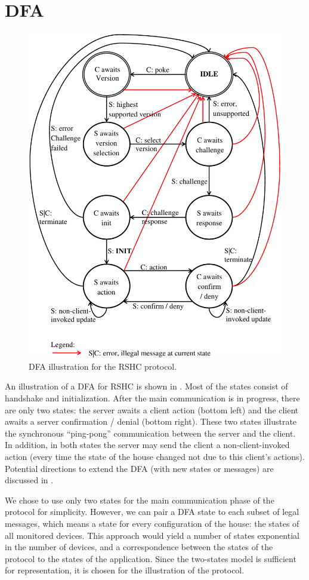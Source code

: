 \section{DFA}
\label{sec:dfa}

\begin{figure}[h]
  \centering
  \includegraphics[width=4.95in]{figures/dfa.pdf}
  \caption{DFA illustration for the RSHC protocol.}
  \label{fig:dfa:dfa}
\end{figure}

An illustration of a DFA for RSHC is shown in . Most of the states consist of handshake and initialization. After the main communication is in progress, there are only two states: the server awaits a client action (bottom left) and the client awaits a server confirmation / denial (bottom right). These two states illustrate the synchronous ``ping-pong'' communication between the server and the client. In addition, in both states the server may send the client a non-client-invoked action (every time the state of the house changed not due to this client's actions). Potential directions to extend the DFA (with new states or messages) are discussed in .

We chose to use only two states for the main communication phase of the protocol for simplicity. However, we can pair a DFA state to each subset of legal messages, which means a state for every configuration of the house: the states of all monitored devices. This approach would yield a number of states exponential in the number of devices, and a correspondence between the states of the protocol to the states of the application. Since the two-states model is sufficient for representation, it is chosen for the illustration of the protocol.
